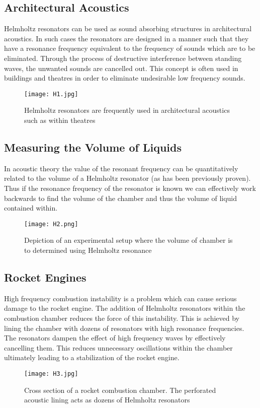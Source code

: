 \documentclass[10pt, a4paper]{article}
\begin{document}
\subsection*{Architectural Acoustics}
Helmholtz resonators can be used as sound absorbing structures in architectural acoustics. In such cases the resonators are designed in a manner such that they have a resonance frequency equivalent to the frequency of sounds which are to be eliminated. Through the process of destructive interference between standing waves, the unwanted sounds are cancelled out. This concept is often used in buildings and theatres in order to eliminate undesirable low frequency sounds.
\begin{figure}[H]
    \centering
    \texttt{[image: H1.jpg]}
    \caption{Helmholtz resonators are frequently used in architectural acoustics such as within theatres}
\end{figure}
\subsection*{Measuring the Volume of Liquids}
In acoustic theory the value of the resonant frequency can be quantitatively related to the volume of a Helmholtz resonator (as has been previously proven). Thus if the resonance frequency of the resonator is known we can effectively work backwards to find the volume of the chamber and thus the volume of liquid contained within. 
\begin{figure}[H]
    \centering
    \texttt{[image: H2.png]}
    \caption{Depiction of an experimental setup where the volume of chamber is to determined using Helmholtz resonance}
\end{figure}
\subsection*{Rocket Engines}
High frequency combustion instability is a problem which can cause serious damage to the rocket engine. The addition of Helmholtz resonators within the combustion chamber reduces the force of this instability. This is achieved by lining the chamber with dozens of resonators with high resonance frequencies. The resonators dampen the effect of high frequency waves by effectively cancelling them. This reduces unnecessary oscillations within the chamber ultimately leading to a stabilization of the rocket engine.
\begin{figure}[H]
    \centering
    \texttt{[image: H3.jpg]}
    \caption{Cross section of a rocket combustion chamber.  The perforated acoustic lining acts as dozens of Helmholtz resonators}
\end{figure}
\end{document}
